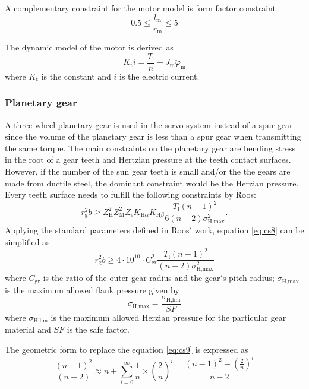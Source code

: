 A complementary constraint for the motor model is form factor constraint
\begin{equation} \label{eq:cs6}
0.5 \leq \frac{l_{\text{m}}}{r_{\text{m}}} \leq 5
\end{equation}

The dynamic model of the motor is derived as
\begin{equation} \label{eq:cs7}
K_{\text{t}}i= \frac{T_{\text{l}}}{n} + J_{\text{m}}\ddot{{\varphi}}_{\text{m}}
\end{equation}
where $K_{\text{t}}$ is the constant and $i$ is the electric current.


\subsubsection*{Planetary gear}
A three wheel planetary gear is used in the servo system instead of a spur gear since the volume of the planetary gear is less than a spur gear when transmitting the same torque. The main constraints on the planetary gear are bending stress in the root of a gear teeth and Hertzian pressure at the teeth contact surfaces. However, if the number of the sun gear teeth is small and/or the the gears are made from ductile steel, the dominant constraint would be the Herzian pressure. Every teeth surface needs to fulfill the following constraints by Roos:
\begin{equation} \label{eq:cs8}
r_{\text{g}}^2b \geq Z_{\text{H}}^2 Z_{\text{M}}^2 Z_{\epsilon} K_{\text{H} \alpha} K_{\text{H} \beta} \frac{T_{\text{l}}(n-1)^2}{6(n-2)\sigma_{\text{H,max}}^2}.
\end{equation}
Applying the standard parameters defined in Roos$'$ work, equation \ref{eq:cs8} can be simplified as
\begin{equation} \label{eq:cs9}
r_{\text{g}}^2b \geq 4\cdot10^{10} \cdot C_{\text{gr}}^2\frac{T_{\text{l}}(n-1)^2}{(n-2)\sigma_{\text{H,max}}^2}
\end{equation}
where $C_{\text{gr}}$ is the ratio of the outer gear radius and the gear$'$s pitch radius; $\sigma_{\text{H,max}}$ is the maximum allowed flank pressure given by
\begin{equation} \label{eq:cs10}
\sigma_{\text{H,max}}=\frac{\sigma_{\text{H,lim}}}{SF}
\end{equation}
where $\sigma_{\text{H,lim}}$ is the maximum allowed Herzian pressure for the particular gear material and $SF$ is the safe factor.

The geometric form to replace the equation \ref{eq:cs9} is expressed as
\begin{equation} \label{eq:cs11}
\frac{(n-1)^2}{(n-2)} \approx n+\sum_{i=0}^{\infty} \frac{1}{n}\times(\frac{2}{n})^i = \frac{(n-1)^2-(\frac{2}{n})^i}{n-2}
\end{equation}

